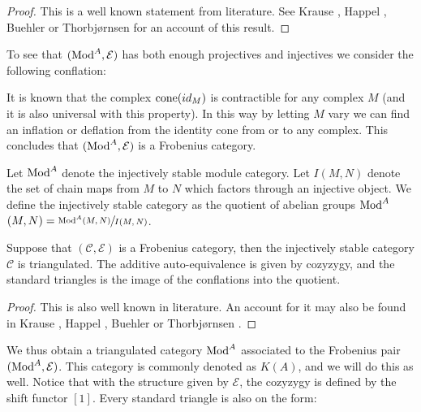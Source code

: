 \documentclass[../thesis.tex]{subfiles}
\begin{document}
            \begin{proof}
                This is a well known statement from literature. See Krause \cite{Krause21}, Happel \cite{Happel88}, Buehler \cite{Buhler10} or Thorbjørnsen \cite{Thorbjornsen21} for an account of this result.
            \end{proof}

            To see that $(\tt{Mod}^A, \mathcal{E})$ has both enough projectives and injectives we consider the following conflation:

            \begin{center}
            \end{center}

            It is known that the complex $\tt{cone}(id_M)$ is contractible for any complex $M$ (and it is also universal with this property). In this way by letting $M$ vary we can find an inflation or deflation from the identity cone from or to any complex. This concludes that $(\tt{Mod}^A, \mathcal{E})$ is a Frobenius category.
            
            Let \underline{$\tt{Mod}^A$} denote the injectively stable module category. Let $I(M,N)$ denote the set of chain maps from $M$ to $N$ which factors through an injective object. We define the injectively stable category as the quotient of abelian groups \underline{$\tt{Mod}^A$}$(M,N)=\sfrac{\tt{Mod}^A(M,N)}{I(M,N)}$.

            \begin{thm}
                Suppose that $(\mathcal{C},\mathcal{E})$ is a Frobenius category, then the injectively stable category \underline{$\mathcal{C}$} is triangulated. The additive auto-equivalence is given by cozyzygy, and the standard triangles is the image of the conflations into the quotient.
            \end{thm}

            \begin{proof}
                This is also well known in literature. An account for it may also be found in Krause \cite{Krause21}, Happel \cite{Happel88}, Buehler \cite{Buhler10} or Thorbjørnsen \cite{Thorbjornsen21}.
            \end{proof}

            We thus obtain a triangulated category \underline{$\tt{Mod}^A$} associated to the Frobenius pair $(\tt{Mod}^A, \mathcal{E})$. This category is commonly denoted as $K(A)$, and we will do this as well. Notice that with the structure given by $\mathcal{E}$, the cozyzygy is defined by the shift functor $[1]$. Every standard triangle is also on the form:
\end{document}
